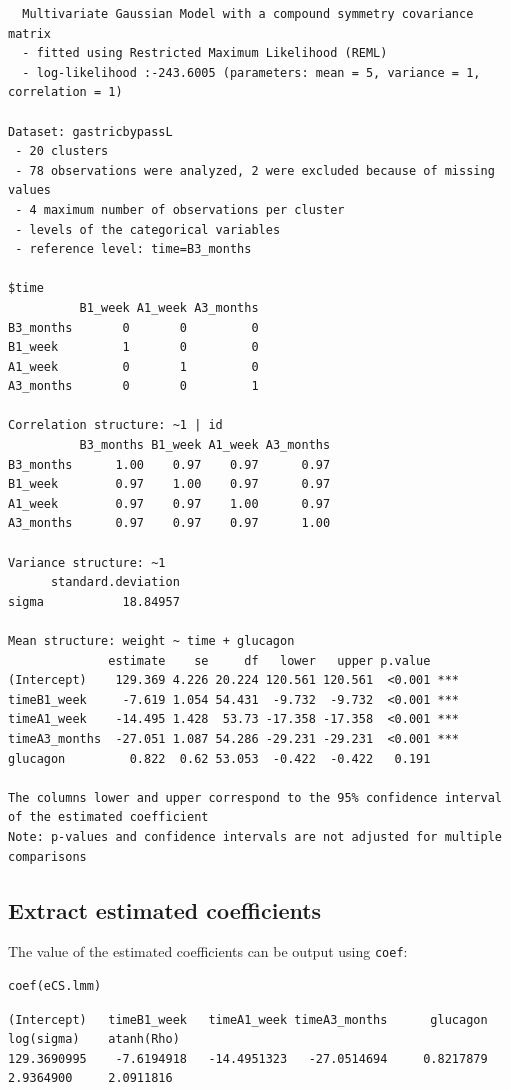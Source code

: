 \documentclass[12pt]{article}
\begin{document}
\begin{verbatim}
  Multivariate Gaussian Model with a compound symmetry covariance matrix 
  - fitted using Restricted Maximum Likelihood (REML) 
  - log-likelihood :-243.6005 (parameters: mean = 5, variance = 1, correlation = 1)
 
Dataset: gastricbypassL 
 - 20 clusters 
 - 78 observations were analyzed, 2 were excluded because of missing values 
 - 4 maximum number of observations per cluster 
 - levels of the categorical variables 
 - reference level: time=B3_months 
 
$time
          B1_week A1_week A3_months
B3_months       0       0         0
B1_week         1       0         0
A1_week         0       1         0
A3_months       0       0         1

Correlation structure: ~1 | id 
          B3_months B1_week A1_week A3_months
B3_months      1.00    0.97    0.97      0.97
B1_week        0.97    1.00    0.97      0.97
A1_week        0.97    0.97    1.00      0.97
A3_months      0.97    0.97    0.97      1.00

Variance structure: ~1 
      standard.deviation
sigma           18.84957

Mean structure: weight ~ time + glucagon 
              estimate    se     df   lower   upper p.value    
(Intercept)    129.369 4.226 20.224 120.561 120.561  <0.001 ***
timeB1_week     -7.619 1.054 54.431  -9.732  -9.732  <0.001 ***
timeA1_week    -14.495 1.428  53.73 -17.358 -17.358  <0.001 ***
timeA3_months  -27.051 1.087 54.286 -29.231 -29.231  <0.001 ***
glucagon         0.822  0.62 53.053  -0.422  -0.422   0.191    

The columns lower and upper correspond to the 95% confidence interval of the estimated coefficient
Note: p-values and confidence intervals are not adjusted for multiple comparisons
\end{verbatim}

\clearpage

\subsection{Extract estimated coefficients}
\label{sec:orgbe29889}
The value of the estimated coefficients can be output using \texttt{coef}:
\lstset{language=r,label= ,caption= ,captionpos=b,numbers=none}
\begin{lstlisting}
coef(eCS.lmm)
\end{lstlisting}

\begin{verbatim}
(Intercept)   timeB1_week   timeA1_week timeA3_months      glucagon    log(sigma)    atanh(Rho) 
129.3690995    -7.6194918   -14.4951323   -27.0514694     0.8217879     2.9364900     2.0911816
\end{verbatim}
\end{document}
